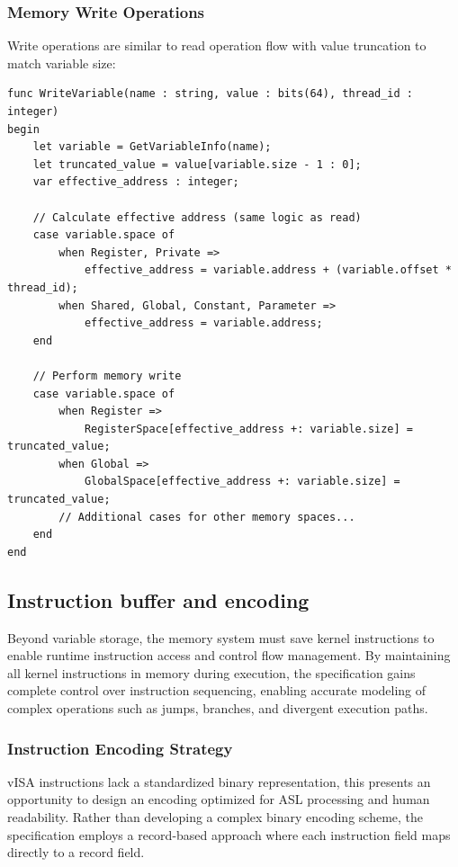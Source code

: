 \subsubsection{Memory Write Operations}
Write operations are similar to read operation flow with value truncation to
match variable size:

\begin{lstlisting}[caption={Memory Write Implementation}, label={lst:memory_write}]
func WriteVariable(name : string, value : bits(64), thread_id : integer)
begin
    let variable = GetVariableInfo(name);
    let truncated_value = value[variable.size - 1 : 0];
    var effective_address : integer;

    // Calculate effective address (same logic as read)
    case variable.space of
        when Register, Private =>
            effective_address = variable.address + (variable.offset * thread_id);
        when Shared, Global, Constant, Parameter =>
            effective_address = variable.address;
    end

    // Perform memory write
    case variable.space of
        when Register =>
            RegisterSpace[effective_address +: variable.size] = truncated_value;
        when Global =>
            GlobalSpace[effective_address +: variable.size] = truncated_value;
        // Additional cases for other memory spaces...
    end
end
\end{lstlisting}

\subsection{Instruction buffer and encoding}
\label{subsec:instruction_buffer}

Beyond variable storage, the memory system must save kernel instructions to
enable runtime instruction access and control flow management. By maintaining
all kernel instructions in memory during execution, the specification gains
complete control over instruction sequencing, enabling accurate modeling of
complex operations such as jumps, branches, and divergent execution paths.

\subsubsection{Instruction Encoding Strategy}
\label{subsubsec:instruction_encoding}

vISA instructions lack a standardized binary representation, this presents an
opportunity to design an encoding optimized for ASL processing and human
readability. Rather than developing a complex binary encoding scheme, the
specification employs a record-based approach where each instruction field maps
directly to a record field.


